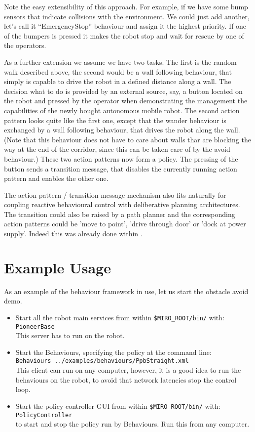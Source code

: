 Note the easy extensibility of this approach. For example, if we have
some bump sensors that indicate collisions with the environment. We
could just add another, let's call it ``EmergencyStop'' behaviour and
assign it the highest priority.  If one of the bumpers is pressed it
makes the robot stop and wait for rescue by one of the operators.

As a further extension we assume we have two tasks. The first is the
random walk described above, the second would be a wall following
behaviour, that simply is capable to drive the robot in a defined
distance along a wall. The decision what to do is provided by an
external source, say, a button located on the robot and pressed by the
operator when demonstrating the management the capabilities of the
newly bought autonomous mobile robot. The second action pattern looks
quite like the first one, except that the wander behaviour is
exchanged by a wall following behaviour, that drives the robot along
the wall. (Note that this behaviour does not have to care about walls
thar are blocking the way at the end of the corridor, since this can
be taken care of by the avoid behaviour.) These two action patterns
now form a policy. The pressing of the button sends a transition
message, that disables the currently running action pattern and
enables the other one.

The action pattern / transition message mechanism also fits naturally
for coupling reactive behavioural control with deliberative planning
architectures. The transition could also be raised by a path planner
and the corresponding action patterns could be 'move to point', 'drive
through door' or 'dock at power supply'. Indeed this was already done
within \cite{Hans-Diplom}.


\section{Example Usage}

As an example of the behaviour framework in use,
let us start the obstacle avoid demo.
\begin{itemize}
\item
  Start all the robot main services from within {\tt \$MIRO\_ROOT/bin/}
  with: \\
  {\tt PioneerBase} \\
  This server has to run on the robot.
\item
  Start the Behaviours, specifying the policy at the command line: \\
  {\tt Behaviours ../examples/behaviours/PpbStraight.xml} \\
  This client can run on any computer, however,
  it is a good idea to run the behaviours on the robot,
  to avoid that network latencies stop the control loop.
\item
  Start the policy controller GUI from within
  {\tt \$MIRO\_ROOT/bin/} with: \\
  {\tt PolicyController} \\
  to start and stop the policy run by Behaviours.
  Run this from any computer.
\end{itemize}

